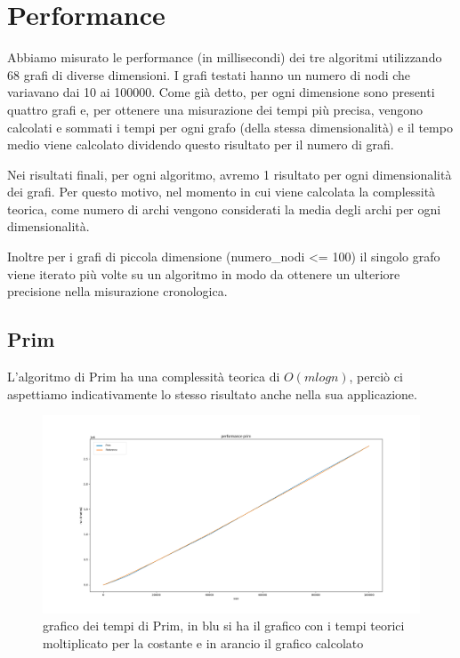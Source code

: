 \section{Performance}
Abbiamo misurato le performance (in millisecondi) dei tre algoritmi utilizzando 68 grafi di diverse dimensioni.
I grafi testati hanno un numero di nodi che variavano dai  10 ai 100000.
Come già detto, per ogni dimensione sono presenti quattro grafi e, per ottenere una misurazione dei tempi più precisa, vengono calcolati e sommati i tempi per ogni grafo (della stessa dimensionalità) e il tempo medio viene calcolato dividendo questo risultato per il numero di grafi.

Nei risultati finali, per ogni algoritmo, avremo 1 risultato per ogni dimensionalità dei grafi. 
Per questo motivo, nel momento in cui viene calcolata la complessità teorica, come numero di archi vengono considerati la media degli archi per ogni dimensionalità. 

Inoltre per i grafi di piccola dimensione (numero\_nodi <= 100) il singolo grafo viene iterato più volte su un algoritmo in modo da ottenere un ulteriore precisione nella misurazione cronologica.

\subsection{Prim}
L'algoritmo di Prim ha una complessità teorica di $O(mlogn)$, perciò ci aspettiamo indicativamente lo stesso risultato anche nella sua applicazione.

\begin{figure}[htbp]
    \centering
    \centerline{\includegraphics[scale = 0.38]{Fig/primFinale.png}}
    \caption{grafico dei tempi di Prim, in blu si ha il grafico con i tempi teorici moltiplicato per la costante e in arancio il grafico calcolato}
    \label{Prim}
\end{figure}

